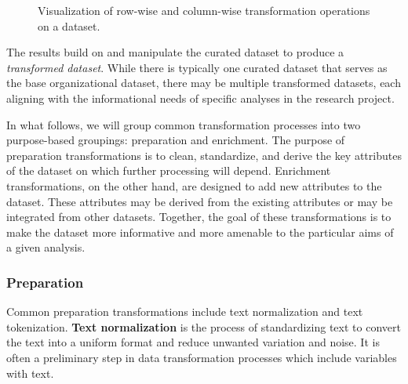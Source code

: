\documentclass[
  letterpaper,
]{latex/krantz}
\theoremstyle{definition}
\theoremstyle{remark}
\begin{document}
\begin{figure}[H]


\caption{\label{fig-ud-transformations}Visualization of row-wise and
column-wise transformation operations on a dataset.}

\end{figure}%

The results build on and manipulate the curated dataset to produce a
\emph{transformed dataset}. While there is typically one curated dataset
that serves as the base organizational dataset, there may be multiple
transformed datasets, each aligning with the informational needs of
specific analyses in the research project.

In what follows, we will group common transformation processes into two
purpose-based groupings: preparation and enrichment. The purpose of
preparation transformations is to clean, standardize, and derive the key
attributes of the dataset on which further processing will depend.
Enrichment transformations, on the other hand, are designed to add new
attributes to the dataset. These attributes may be derived from the
existing attributes or may be integrated from other datasets. Together,
the goal of these transformations is to make the dataset more
informative and more amenable to the particular aims of a given
analysis.

\subsubsection{Preparation}\label{preparation}

Common preparation transformations include text normalization and text
tokenization. \textbf{Text normalization} is the process of
standardizing text to convert the text into a uniform format and reduce
unwanted variation and noise. It is often a preliminary step in data
transformation processes which include variables with text.
\end{document}
